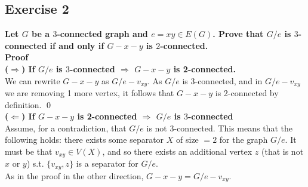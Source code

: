 \subsection*{Exercise 2}
\boldmath
\textbf{Let $G$ be a $3$-connected graph and $e = xy \in E(G)$. Prove that $G/e$ is $3$-connected if and only if $G - x - y$ is $2$-connected.\\\linebreak Proof\\}
\unboldmath
\textbf{ \boldmath
($\Rightarrow$) If $G/e$ is $3$-connected $\Rightarrow$ $G-x-y$ is 2-connected. \unboldmath} \\
\linebreak 
We can rewrite $G-x-y$ as $G/e - v_{xy}$. As $G/e$ is 3-connected, and in $G/e - v_{xy}$ we are removing 1 more vertex, it follows that $G-x-y$ is 2-connected by definition. \qed \\
\linebreak 
\textbf{ \boldmath
($\Leftarrow$) If $G - x - y$ is 2-connected $\Rightarrow$ $G/e$ is $3$-connected \unboldmath} \\
\linebreak
Assume, for a contradiction, that $G/e$ is not 3-connected. This means that the following holds: there exists some separator $X$ of size $ = 2$ for the graph $G/e$. It must be that $v_{xy} \in V(X)$, and so there exists an additional vertex $z$ (that is not $x$ or $y$) s.t. $\{v_{xy}, z\}$ is a separator for $G/e$. \\
\linebreak 
As in the proof in the other direction, $G-x-y = G/e - v_{xy}$. 